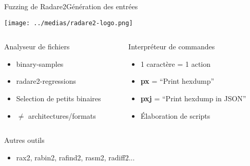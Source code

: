 \begin{frame}[fragile]{Fuzzing de Radare2}{Génération des entrées}
  \begin{center}
    \texttt{[image: ../medias/radare2-logo.png]}
    \vspace{-0.2cm}
  \end{center}
  \begin{columns}[T]
    \begin{column}{0.44\linewidth}

      \begin{block}{Analyseur de fichiers}
        \begin{itemize}
        \item{binary-samples}
        \item{radare2-regressions}
        \item{Selection de petits binaires}
        \item{$\ne$ architectures/formats}
        \end{itemize}
      \end{block}
    \end{column}

    \begin{column}{0.44\linewidth}
      \begin{block}{Interpréteur de commandes}
        \begin{itemize}
        \item{1 caractère = 1 action}
        \item{\textbf{px} = ``Print hexdump''}
        \item{\textbf{pxj} = ``Print hexdump in JSON''}
        \item{Élaboration de scripts}
        \end{itemize}
      \end{block}
    \end{column}
  \end{columns}
  \pause
  \vfill
  \begin{exampleblock}{Autres outils}
    \begin{itemize}
    \item{rax2, rabin2, rafind2, rasm2, radiff2...}
    \end{itemize}
  \end{exampleblock}
\end{frame}

